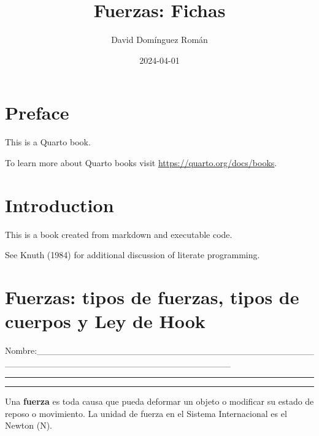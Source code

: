 \documentclass[
  letterpaper,
  DIV=11,
  numbers=noendperiod]{scrreprt}
\title{Fuerzas: Fichas}
\author{David Domínguez Román}
\date{2024-04-01}
\renewcommand*\contentsname{Table of contents}
\newcommand\contentsname{Table of contents}
\begin{document}
\maketitle

\renewcommand*\contentsname{Table of contents}
{
\hypersetup{linkcolor=}
\setcounter{tocdepth}{2}
\tableofcontents
}

\chapter*{Preface}\label{preface}


This is a Quarto book.

To learn more about Quarto books visit
\url{https://quarto.org/docs/books}.


\chapter{Introduction}\label{introduction}

This is a book created from markdown and executable code.

See Knuth (1984) for additional discussion of literate programming.


\chapter{Fuerzas: tipos de fuerzas, tipos de cuerpos y Ley de
Hook}\label{fuerzas-tipos-de-fuerzas-tipos-de-cuerpos-y-ley-de-hook}

Nombre:\_\_\_\_\_\_\_\_\_\_\_\_\_\_\_\_\_\_\_\_\_\_\_\_\_\_\_\_\_\_\_\_\_\_\_\_\_\_\_\_\_\_\_\_\_\_\_\_\_\_\_\_\_\_\_\_\_\_\_\_\_\_\_\_\_\_\_\_\_\_\_\_\_\_\_\_\_\_

\begin{center}\rule{0.5\linewidth}{0.5pt}\end{center}

\begin{center}\rule{0.5\linewidth}{0.5pt}\end{center}

Una \textbf{fuerza} es toda causa que pueda deformar un objeto o
modificar su estado de reposo o movimiento. La unidad de fuerza en el
Sistema Internacional es el Newton (N).
\end{document}
